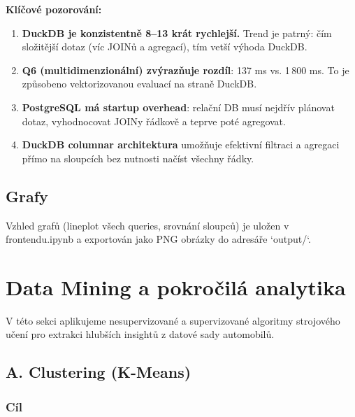 \documentclass[12pt,a4paper]{article}
\begin{document}
\textbf{Klíčové pozorování:}
\begin{enumerate}
    \item \textbf{DuckDB je konzistentně 8–13 krát rychlejší.} Trend je patrný:
          čím složitější dotaz (víc JOINů a agregací), tím vetší výhoda DuckDB.
    
    \item \textbf{Q6 (multidimenzionální) zvýrazňuje rozdíl}: 137 ms vs. 1\,800 ms.
          To je způsobeno vektorizovanou evaluací na straně DuckDB.
    
    \item \textbf{PostgreSQL má startup overhead}: relační DB musí nejdřív plánovat dotaz,
          vyhodnocovat JOINy řádkově a teprve poté agregovat.
    
    \item \textbf{DuckDB columnar architektura} umožňuje efektivní filtraci a agregaci
          přímo na sloupcích bez nutnosti načíst všechny řádky.
\end{enumerate}

\subsection{Grafy}

Vzhled grafů (lineplot všech queries, srovnání sloupců) je uložen v frontendu.ipynb
a exportován jako PNG obrázky do adresáře `output/`.

\newpage

\section{Data Mining a pokročilá analytika}

V této sekci aplikujeme nesupervizované a supervizované algoritmy strojového učení
pro extrakci hlubších insightů z datové sady automobilů.

\subsection{A. Clustering (K-Means)}

\subsubsection{Cíl}
\end{document}

